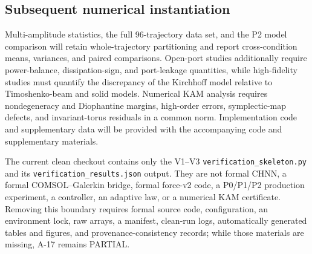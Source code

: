 \subsection{Subsequent numerical instantiation}

Multi-amplitude statistics, the full 96-trajectory data set, and the P2 model comparison will retain whole-trajectory partitioning and report cross-condition means, variances, and paired comparisons. Open-port studies additionally require power-balance, dissipation-sign, and port-leakage quantities, while high-fidelity studies must quantify the discrepancy of the Kirchhoff model relative to Timoshenko-beam and solid models. Numerical KAM analysis requires nondegeneracy and Diophantine margins, high-order errors, symplectic-map defects, and invariant-torus residuals in a common norm. Implementation code and supplementary data will be provided with the accompanying code and supplementary materials.

The current clean checkout contains only the V1--V3 \texttt{verification\_skeleton.py} and its \texttt{verification\_results.json} output. They are not formal CHNN, a formal COMSOL--Galerkin bridge, formal force-v2 code, a P0/P1/P2 production experiment, a controller, an adaptive law, or a numerical KAM certificate. Removing this boundary requires formal source code, configuration, an environment lock, raw arrays, a manifest, clean-run logs, automatically generated tables and figures, and provenance-consistency records; while those materials are missing, A-17 remains PARTIAL.
